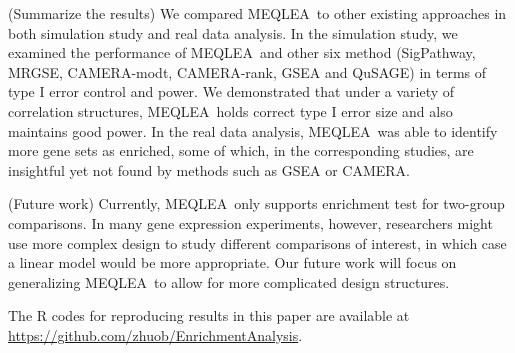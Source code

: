 \documentclass[a4,center,fleqn]{NAR}
\newcommand{\OurMethod}{MEQLEA}
\newcommand{\CMR}{CAMERA-rank}
\newcommand{\CMT}{CAMERA-modt}
\newcommand{\gent}{SigPathway}
\newcommand{\genr}{MRGSE}
\begin{document}
	(Summarize the results) We compared \OurMethod~to other existing approaches in both simulation
	study and real data analysis. In the simulation study, we examined the performance of \OurMethod~and
	other six method (\gent, \genr, \CMT, \CMR, GSEA and QuSAGE) in terms of type I error control and
	power. We demonstrated that under a variety of correlation structures, \OurMethod~holds correct type
	I error size and also maintains good power. In the real data analysis, \OurMethod~was able to
	identify more gene sets as enriched, some of which, in the corresponding studies, are insightful yet
	not found by methods such as GSEA or CAMERA.  
	
	(Future work) Currently, \OurMethod~only supports enrichment test for two-group comparisons. In
	many gene expression experiments, however, researchers might use more complex design to study
	different comparisons of interest, in which case a linear model would be more appropriate. Our
	future work will focus on generalizing \OurMethod~to allow for more complicated design structures. 
	
	The R codes for reproducing results in this paper are available at
	\url{https://github.com/zhuob/EnrichmentAnalysis}.
	
\end{document}

